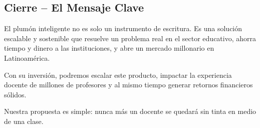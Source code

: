 \subsection*{Cierre – El Mensaje Clave}
El plumón inteligente no es solo un instrumento de escritura. Es una solución escalable y sostenible que resuelve un problema real en el sector educativo, ahorra tiempo y dinero a las instituciones, y abre un mercado millonario en Latinoamérica.

Con su inversión, podremos escalar este producto, impactar la experiencia docente de millones de profesores y al mismo tiempo generar retornos financieros sólidos.

Nuestra propuesta es simple: nunca más un docente se quedará sin tinta en medio de una clase.
